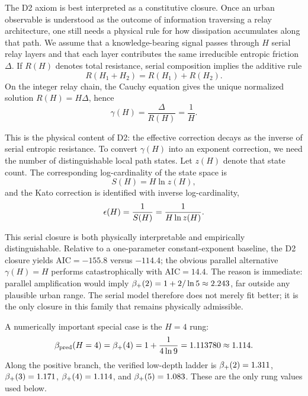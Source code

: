 The D2 axiom is best interpreted as a constitutive closure.
Once an urban observable is understood as the outcome of information traversing
a relay architecture, one still needs a physical rule for how dissipation
accumulates along that path.
We assume that a knowledge-bearing signal passes through \(H\) serial relay
layers and that each layer contributes the same irreducible entropic friction
\(\Delta\).
If \(R(H)\) denotes total resistance, serial composition implies the additive
rule
\begin{equation}
R(H_1+H_2)=R(H_1)+R(H_2).
\label{eq:cauchy}
\end{equation}
On the integer relay chain, the Cauchy equation gives the unique normalized
solution \(R(H)=H\Delta\), hence
\begin{equation}
\gamma(H)=\frac{\Delta}{R(H)}=\frac{1}{H}.
\label{eq:gamma}
\end{equation}

This is the physical content of D2: the effective correction decays as the
inverse of serial entropic resistance.
To convert \(\gamma(H)\) into an exponent correction, we need the number of
distinguishable local path states.
Let \(z(H)\) denote that state count.
The corresponding log-cardinality of the state space is
\begin{equation}
S(H)=H\ln z(H),
\label{eq:entropy}
\end{equation}
and the Kato correction is identified with inverse log-cardinality,
\begin{equation}
\epsilon\!\left(H\right)=\frac{1}{S(H)}=\frac{1}{H\ln z(H)}.
\label{eq:epsilon_general}
\end{equation}

This serial closure is both physically interpretable and empirically
distinguishable.
Relative to a one-parameter constant-exponent baseline, the D2 closure yields
\(\mathrm{AIC}=-155.8\) versus \(-114.4\); the obvious parallel alternative
\(\gamma(H)=H\) performs catastrophically with \(\mathrm{AIC}=14.4\).
The reason is immediate:
parallel amplification would imply
\(\beta_+\!\left(2\right)=1+2/\ln 5\approx 2.243\), far outside any plausible urban range.
The serial model therefore does not merely fit better; it is the only closure
in this family that remains physically admissible.

A numerically important special case is the \(H=4\) rung:
\begin{equation}
\beta_{\mathrm{pred}}(H=4)=\beta_+\!\left(4\right)=1+\frac{1}{4\ln 9}=1.113780\approx 1.114.
\label{eq:h4_pred}
\end{equation}
Along the positive branch, the verified low-depth ladder is
\(\beta_+\!\left(2\right)=1.311\), \(\beta_+\!\left(3\right)=1.171\), \(\beta_+\!\left(4\right)=1.114\), and
\(\beta_+\!\left(5\right)=1.083\).
These are the only rung values used below.

